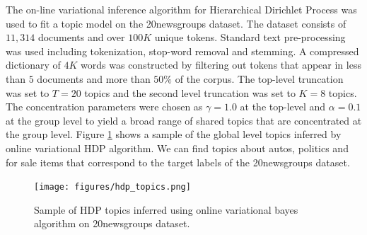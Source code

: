 The on-line variational inference algorithm for Hierarchical Dirichlet Process was used to fit a topic model on the 20newsgroups dataset. The dataset consists of $11,314$ documents and over $100K$ unique tokens. Standard text pre-processing was used including tokenization, stop-word removal and stemming. A compressed dictionary of $4K$ words was constructed by filtering out tokens that appear in less than $5$ documents and more than $50\%$ of the corpus. The top-level truncation was set to $T=20$ topics and the second level truncation was set to $K=8$ topics. The concentration parameters were chosen as $\gamma = 1.0$ at the top-level and $\alpha=0.1$ at the group level to yield a broad range of shared topics that are concentrated at the group level. Figure \ref{fig:hdp_topics_vb} shows a sample of the global level topics inferred by online variational HDP algorithm. We can find topics about autos, politics and for sale items that correspond to the target labels of the 20newsgroups dataset.

\begin{figure}[thpb]
    \centering
    \texttt{[image: figures/hdp\_topics.png]}
    \caption{Sample of HDP topics inferred using online variational bayes algorithm on 20newsgroups dataset.}
    \label{fig:hdp_topics_vb}
\end{figure}

